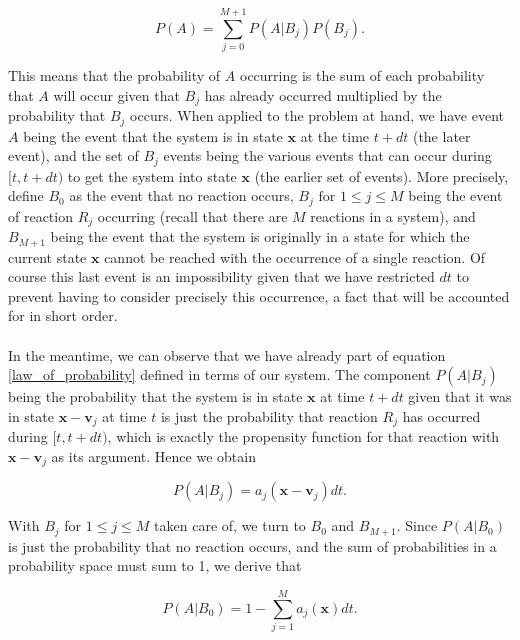 \documentclass[ugrad,lot,lof,openright,11pt,oneside,onehalfspace]{RUthesis}
\begin{document}
				\begin{equation}\label{law_of_probability}
				P(A) = \sum\limits_{j=0}^{M+1} P(A|B_j)P(B_j).
				\end{equation}

				\noindent
				This means that the probability of $A$ occurring is the sum of each probability that $A$ will occur given that $B_j$ has already occurred multiplied by the probability that $B_j$ occurs. When applied to the problem at hand, we have event $A$ being the event that the system is in state $\mathbf{x}$ at the time $t+dt$ (the later event), and the set of $B_j$ events being the various events that can occur during $[t,t+dt)$ to get the system into state $\mathbf{x}$ (the earlier set of events). More precisely, define $B_0$ as the event that no reaction occurs, $B_j \text{ for } 1 \leq j \leq M $ being the event of reaction $R_j$ occurring (recall that there are $M$ reactions in a system), and $B_{M+1}$ being the event that the system is originally in a state for which the current state $\mathbf{x}$ cannot be reached with the occurrence of a single reaction. Of course this last event is an impossibility given that we have restricted $dt$ to prevent having to consider precisely this occurrence, a fact that will be accounted for in short order.\\
				\\
				In the meantime, we can observe that we have already part of equation \eqref{law_of_probability} defined in terms of our system. The component $P(A|B_j)$ being the probability that the system is in state $\mathbf{x}$ at time $t+dt$ given that it was in state $\mathbf{x}-\mathbf{v}_j$ at time $t$ is just the probability that reaction $R_j$ has occurred during $[t,t+dt)$, which is exactly the propensity function for that reaction with $\mathbf{x}-\mathbf{v}_j$ as its argument. Hence we obtain

				\begin{equation}\label{prop_prob}
				P(A|B_j) = a_j(\mathbf{x}-\mathbf{v}_j)dt.
				\end{equation}

				\noindent
				With $B_j$ for $1 \leq j \leq M$ taken care of, we turn to $B_0$ and $B_{M+1}$. Since $P(A|B_0)$ is just the probability that no reaction occurs, and the sum of probabilities in a probability space must sum to 1, we derive that

				\begin{equation}\label{prob_no_reac}
				P(A|B_0) = 1 - \sum\limits_{j=1}^M a_j(\mathbf{x})dt.
				\end{equation}
\end{document}
